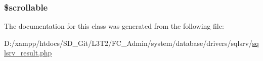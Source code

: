 \subsubsection[{\$scrollable}]{\setlength{\rightskip}{0pt plus 5cm}\$scrollable}\label{class_c_i___d_b__sqlsrv__result_a76095eacf021915db9aabc44ecf58555}


The documentation for this class was generated from the following file\+:\begin{DoxyCompactItemize}
\item 
D\+:/xampp/htdocs/\+S\+D\+\_\+\+Git/\+L3\+T2/\+F\+C\+\_\+\+Admin/system/database/drivers/sqlsrv/\hyperlink{sqlsrv__result_8php}{sqlsrv\+\_\+result.\+php}\end{DoxyCompactItemize}
